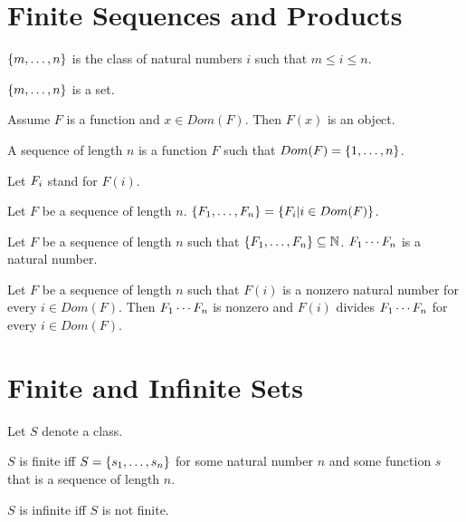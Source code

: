 \documentclass[11pt]{article}
\begin{document}
\section{Finite Sequences and Products}

\begin{forthel}
\begin{definition} $\{m,\dots,n\}$ is the class of
natural numbers $i$ such that $m \leq i \leq n$.
\end{definition}

\begin{axiom} $\{m,\dots,n\}$ is a set. \end{axiom}

\begin{axiom}
Assume $F$ is a function and $x \in Dom(F)$. Then $F(x)$ is an object.
\end{axiom}

\begin{definition} A sequence of length $n$ is a
function $F$ such that $Dom(F) = \{1,\dots,n\}$.
\end{definition}

Let $F_{i}$ stand for $F(i)$.

\begin{definition} Let $F$ be a sequence of length $n$.
$\{F_{1},\dots,F_{n}\} = \{ F_{i} | i \in Dom(F)\}$.
\end{definition}

\begin{signature} Let $F$ be a sequence of length $n$
such that $\{F_{1},\dots,F_{n}\} \subseteq \mathbb{N}$.
$F_{1} \cdots F_{n}$ is a natural number.
\end{signature}

\begin{axiom}[Factorproperty] Let $F$ be a sequence of length $n$
such that $F(i)$ is a nonzero natural number for every $i \in Dom(F)$.
Then $F_{1} \cdots F_{n}$ is nonzero and 
$F(i)$ divides $F_{1} \cdots F_{n}$ for every $i \in Dom(F)$.
\end{axiom}


\end{forthel}

\section{Finite and Infinite Sets}

\begin{forthel}

Let $S$ denote a class.

\begin{definition} $S$ is finite iff 
$S = \{s_{1},\dots,s_{n}\}$ for some natural number $n$ and some function $s$ that is 
a sequence of length $n$.
\end{definition}

\begin{definition} $S$ is infinite iff $S$ is not finite.
\end{definition}

\end{forthel}
\end{document}
